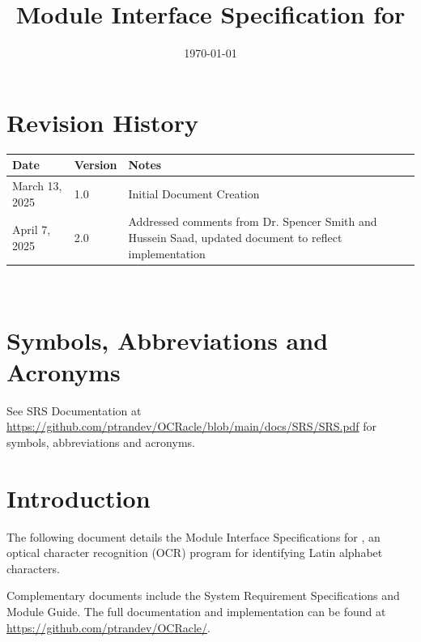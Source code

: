 \documentclass[12pt, titlepage]{article}
\begin{document}
\title{Module Interface Specification for \progname{}}

\author{\authname}

\date{\today}

\maketitle


\section{Revision History}

\begin{tabularx}{\textwidth}{p{3cm}p{2cm}X}
\toprule {\bf Date} & {\bf Version} & {\bf Notes}\\
\midrule
March 13, 2025 & 1.0 & Initial Document Creation\\
April 7, 2025 & 2.0 & Addressed comments from Dr. Spencer Smith and Hussein Saad, updated document to reflect implementation\\
\bottomrule
\end{tabularx}

~\newpage

\section{Symbols, Abbreviations and Acronyms}

See SRS Documentation at \url{https://github.com/ptrandev/OCRacle/blob/main/docs/SRS/SRS.pdf}
for symbols, abbreviations and acronyms.

\newpage

\tableofcontents

\newpage


\section{Introduction}

The following document details the Module Interface Specifications for
\progname{}, an optical character recognition (OCR) program for identifying
Latin alphabet characters.

Complementary documents include the System Requirement Specifications
and Module Guide.  The full documentation and implementation can be
found at \url{https://github.com/ptrandev/OCRacle/}.
\end{document}
